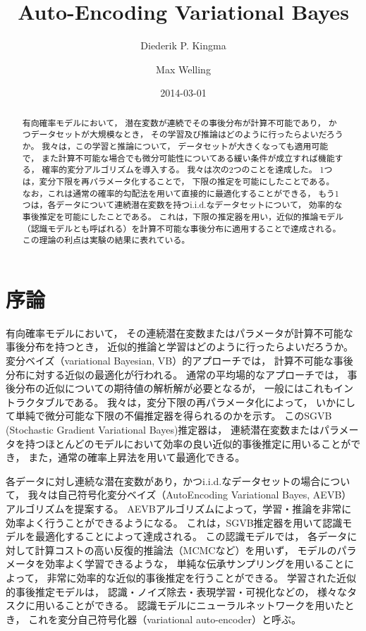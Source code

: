 \documentclass[dvipdfmx, fleqn, draft]{jsarticle}
\title{Auto-Encoding Variational Bayes}
\date{2014-03-01}
\author{
    Diederik P. Kingma
    \and
    Max Welling
    }
\begin{document}
\maketitle



\begin{abstract}
    有向確率モデルにおいて，
    潜在変数が連続でその事後分布が計算不可能であり，
    かつデータセットが大規模なとき，
    その学習及び推論はどのように行ったらよいだろうか。
    我々は，この学習と推論について，
    データセットが大きくなっても適用可能で，
    また計算不可能な場合でも微分可能性についてある緩い条件が成立すれば機能する，
    確率的変分アルゴリズムを導入する。
    我々は次の2つのことを達成した。
    1つは，変分下限を再パラメータ化することで，
    下限の推定を可能にしたことである。
    なお，これは通常の確率的勾配法を用いて直接的に最適化することができる，
    もう1つは，各データについて連続潜在変数を持つi.i.d.なデータセットについて，
    効率的な事後推定を可能にしたことである。
    これは，下限の推定器を用い，近似的推論モデル（認識モデルとも呼ばれる）を計算不可能な事後分布に適用することで達成される。
    この理論の利点は実験の結果に表れている。
\end{abstract}



\section{序論}

有向確率モデルにおいて，
その連続潜在変数またはパラメータが計算不可能な事後分布を持つとき，
近似的推論と学習はどのように行ったらよいだろうか。
変分ベイズ（variational Bayesian, VB）的アプローチでは，
計算不可能な事後分布に対する近似の最適化が行われる。
通常の平均場的なアプローチでは，
事後分布の近似についての期待値の解析解が必要となるが，
一般にはこれもイントラクタブルである。
我々は，変分下限の再パラメータ化によって，
いかにして単純で微分可能な下限の不偏推定器を得られるのかを示す。
このSGVB (Stochastic Gradient Variational Bayes)推定器は，
連続潜在変数またはパラメータを持つほとんどのモデルにおいて効率の良い近似的事後推定に用いることができ，
また，通常の確率上昇法を用いて最適化できる。

各データに対し連続な潜在変数があり，かつi.i.d.なデータセットの場合について，
我々は自己符号化変分ベイズ（AutoEncoding Variational Bayes, AEVB）アルゴリズムを提案する。
AEVBアルゴリズムによって，学習・推論を非常に効率よく行うことができるようになる。
これは，SGVB推定器を用いて認識モデルを最適化することによって達成される。
この認識モデルでは，
各データに対して計算コストの高い反復的推論法（MCMCなど）を用いず，
モデルのパラメータを効率よく学習できるような，
単純な伝承サンプリングを用いることによって，
非常に効率的な近似的事後推定を行うことができる。
学習された近似的事後推定モデルは，
認識・ノイズ除去・表現学習・可視化などの，
様々なタスクに用いることができる。
認識モデルにニューラルネットワークを用いたとき，
これを変分自己符号化器（variational auto-encoder）と呼ぶ。
\end{document}
